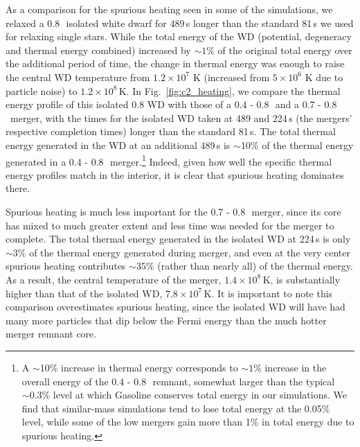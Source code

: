 As a comparison for the spurious heating seen in some of the simulations, we relaxed a 0.8\,\Msun\ isolated white dwarf for $489\,$s longer than the standard 81\,s we used for relaxing single stars.  While the total energy of the WD (potential, degeneracy and thermal energy combined) increased by $\sim\!1$\% of the original total energy over the additional period of time, the change in thermal energy was enough to raise the central WD temperature from $1.2\times 10^7$ K (increased from $5\times 10^6$ K due to particle noise) to $1.2\times 10^8\,$K.  In Fig.~\ref{fig:c2_heating}, we compare the thermal energy profile of this isolated 0.8 {\Msun} WD with those of a 0.4 - 0.8\,\Msun\ and a 0.7 - 0.8\,\Msun\ merger, with the times for the isolated WD taken at 489 and 224\,s (the mergers' respective completion times) longer than the standard 81\,s.  The total thermal energy generated in the WD at an additional 489\,s is $\sim$10\% of the thermal energy generated in a 0.4 - 0.8\,\Msun\ merger.\footnote{A $\sim$10\% increase in thermal energy corresponds to $\sim\!1$\% increase in the overall energy of the 0.4 - 0.8\,\Msun\ remnant, somewhat larger than the typical $\sim\!0.3$\% level at which Gasoline conserves total energy in our simulations.  We find that similar-mass simulations tend to lose total energy at the 0.05\% level, while some of the low {\qrho} mergers gain more than 1\% in total energy due to spurious heating.}  Indeed, given how well the specific thermal energy profiles match in the interior, it is clear that spurious heating dominates there.  

Spurious heating is much less important for the 0.7 - 0.8\,\Msun\ merger, since its core has mixed to much greater extent and less time was needed for the merger to complete.  The total thermal energy generated in the isolated WD at 224\,s is only $\sim\!3$\% of the thermal energy generated during merger, and even at the very center spurious heating contributes $\sim\!35$\% (rather than nearly all) of the thermal energy.  As a result, the central temperature of the merger, $1.4 \times 10^8\,$K, is substantially higher than that of the isolated WD, $7.8 \times 10^7\,$K.  It is important to note this comparison overestimates spurious heating, since the isolated WD will have had many more particles that dip below the Fermi energy than the much hotter merger remnant core. 

